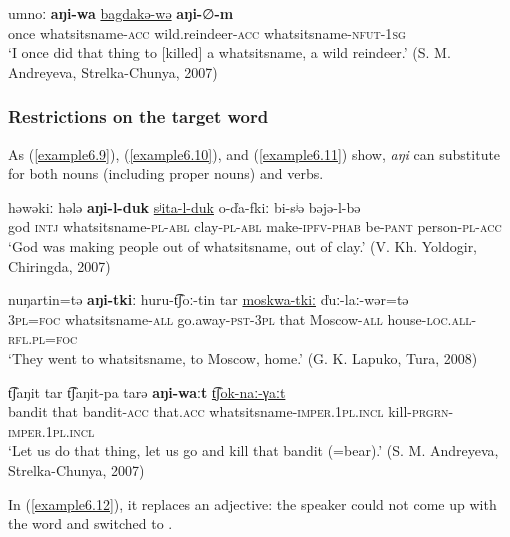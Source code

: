 \documentclass[output=paper,colorlinks,citecolor=brown]{langscibook}
\begin{document}
\ea
    \label{example6.8}
    \gll umnoː	\textbf{aŋi-wa}	\uline{bagdakə-wə}	\textbf{aŋi-}∅\textbf{-m}\\
    once	whatsitsname-\textsc{acc}	wild.reindeer-\textsc{acc}	whatsitsname-\textsc{nfut}-1\textsc{sg}\\
    \glt `I once did that thing to [killed] a whatsitsname, a wild reindeer.’ (S. M. Andreyeva, Strelka-Chunya, 2007)\\
    \z


\subsubsection{Restrictions on the target word}

As (\ref{example6.9}), (\ref{example6.10}), and (\ref{example6.11}) show, \textit{aŋi} can substitute for both nouns (including proper nouns) and verbs. 

\ea
    \label{example6.9}
    \gll həwəkiː	hələ	\textbf{aŋi-l-duk}	\uline{sʲita-l-duk}	o-ďa-fkiː   bi-sʲə	bəjə-l-bə\\
    god	\textsc{intj}	whatsitsname-\textsc{pl}-\textsc{abl}	clay-\textsc{pl}-\textsc{abl}	make-\textsc{ipfv}-\textsc{phab}    be-\textsc{pant}	person-\textsc{pl}-\textsc{acc}\\
    \glt `God was making people out of whatsitsname, out of clay.' (V. Kh. Yoldogir, Chiringda, 2007)\\
    \z

\ea
    \label{example6.10}
    \gll nuŋartin=tə	\textbf{aŋi-tkiː}	huru-t͡ʃoː-tin	tar \uline{moskwa-tkiː}	ďuː-laː-wər=tə\\
    3\textsc{pl}=\textsc{foc}	whatsitsname-\textsc{all}	go.away-\textsc{pst}-3\textsc{pl}	that    Moscow-\textsc{all}	house-\textsc{loc.all}-\textsc{rfl.pl}=\textsc{foc}\\
    \glt `They went to whatsitsname, to Moscow, home.’ (G. K. Lapuko, Tura, 2008)\\
    \z

\ea
    \label{example6.11}
    \gll    t͡ʃaŋit	tar	t͡ʃaŋit-pa	tarə  \textbf{aŋi-waːt}	\uline{t͡ʃok-naː-γaːt}\\
    bandit	that	bandit-\textsc{acc}	that.\textsc{acc} whatsitsname-\textsc{imper}.1\textsc{pl.incl} 	kill-\textsc{prgrn-imper}.1\textsc{pl.incl}\\
    \glt `Let us do that thing, let us go and kill that bandit (=bear).' (S. M. Andreyeva, Strelka-Chunya, 2007)\\
    \z

In (\ref{example6.12}), it replaces an adjective: the speaker could not come up with the  word and switched to .
\end{document}
